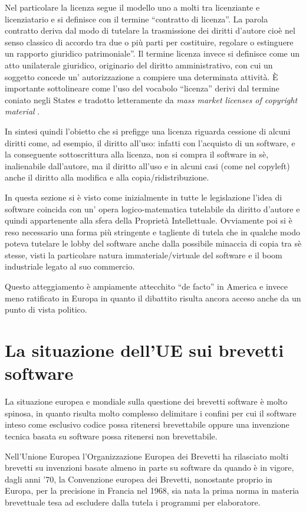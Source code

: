 Nel particolare la licenza segue il modello uno a molti tra licenziante e licenziatario e si definisce con il termine ``contratto di licenza''. La parola contratto deriva dal modo di tutelare la trasmissione dei diritti d'autore cioè nel senso classico di accordo  tra due o più parti per costituire, regolare o estinguere un rapporto giuridico patrimoniale”.
Il termine licenza invece si definisce come un atto unilaterale giuridico, originario del diritto amministrativo, con cui un soggetto concede un' autorizzazione a compiere una determinata attività. \`E importante sottolineare come l'uso del vocabolo ``licenza'' derivi dal termine coniato negli States e tradotto letteramente da \textit{mass market licenses of copyright material }.

In sintesi quindi l'obietto che si prefigge una licenza riguarda cessione di alcuni diritti come, ad esempio, il diritto all'uso: infatti con l'acquisto di un software, e la conseguente sottoscrittura alla licenza, non si compra il software in sè, inalienabile dall'autore, ma il diritto all'uso e in alcuni casi (come nel copyleft) anche il diritto alla modifica e alla copia/ridistribuzione.

In questa sezione si è visto come inizialmente in tutte le legislazione l'idea di software coincida con un' opera logico-matematica tutelabile da diritto d'autore e quindi appartenente alla sfera della Proprietà Intellettuale. Ovviamente poi si è reso necessario una forma più stringente e tagliente di tutela che in qualche modo poteva tutelare le lobby del software anche dalla possibile minaccia di copia tra sè stesse, visti la particolare natura immateriale/virtuale del software e il boom industriale legato al suo commercio.

Questo atteggiamento è ampiamente attecchito ``de facto'' in America e invece meno ratificato in Europa in quanto il dibattito risulta ancora acceso anche da un punto di vista politico.

\section{La situazione dell'UE sui brevetti software}
La situazione europea e mondiale sulla questione dei brevetti software è molto spinosa, in quanto risulta molto complesso delimitare i confini per cui il software inteso come esclusivo codice possa ritenersi brevettabile oppure una invenzione tecnica basata su software possa ritenersi non brevettabile.

Nell'Unione Europea l'Organizzazione Europea dei Brevetti ha rilasciato molti brevetti su invenzioni basate almeno in parte su software da quando è in vigore, dagli anni '70, la Convenzione europea dei Brevetti, nonostante proprio in Europa, per la precisione in Francia nel 1968\cite{invenzione-software}, sia nata la prima norma in materia brevettuale tesa ad escludere dalla tutela i programmi per elaboratore.

